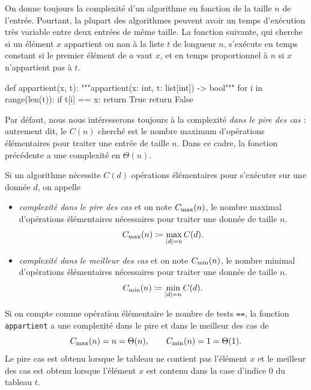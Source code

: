 \documentclass{magnolia}
\begin{document}
On donne toujours la complexité d'un algorithme en fonction de la
taille $n$ de l'entrée. Pourtant, la plupart des algorithmes peuvent
avoir un temps d'exécution très variable entre deux entrées de
même taille. 
La fonction suivante, qui cherche si un élément $x$ appartient ou
non à la liste $t$ de longueur $n$, s'exécute en temps
constant si le premier élément de $a$ vaut $x$, et en temps
proportionnel à $n$ si $x$ n'appartient pas à $t  $.

\begin{pythoncodeline}
def appartient(x, t):
    """appartient(x: int, t: list[int]) -> bool"""
    for i in range(len(t)):
        if t[i] == x:
            return True
    return False
\end{pythoncodeline}

\noindent
Par défaut, nous nous intéresserons toujours à la complexité
\emph{dans le pire des cas} : autrement dit, le $C(n)$ cherché
est le nombre maximum d'opérations élémentaires pour traiter une
entrée de taille $n$. Dans ce cadre, la fonction précédente a une complexité
en $\Theta(n)$.

\begin{definition}
Si un algorithme nécessite $C(d)$ opérations élémentaires pour s'exécuter
sur une donnée $d$, on appelle
\begin{itemize}
\item \emph{complexité dans le pire des cas} et on note $C_{\rm max}(n)$, le nombre maximal
  d'opérations élémentaires nécessaires pour traiter une donnée de taille
  $n$.
  \[C_{\rm max}(n)\coloneqq \max_{\left|d\right|=n} C(d).\]
\item \emph{complexité dans le meilleur des cas} et on note $C_{\rm min}(n)$, le nombre minimal
  d'opérations élémentaires nécessaires pour traiter une donnée de taille
  $n$.
  \[C_{\rm min}(n)\coloneqq \min_{\left|d\right|=n} C(d).\]
\end{itemize}
\end{definition}

\begin{exempleUnique}
\exemple Si on compte comme opération élémentaire le nombre de tests \verb!==!, la fonction \verb!appartient!
  a une complexité dans le pire et dans le meilleur des cas de
  \[C_{\rm max}(n)=n=\Theta(n), \qquad C_{\rm min}(n)=1=\Theta(1).\]
  Le pire cas est obtenu  lorsque le tableau ne contient pas l'élément $x$ et le meilleur des cas
  est obtenu lorsque l'élément $x$ est contenu dans la case d'indice 0 du tableau $t$.
\end{exempleUnique}
\end{document}
